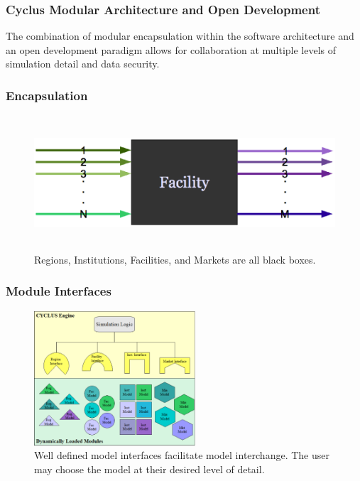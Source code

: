 \begin{frame}
  \frametitle{Cyclus Modular Architecture and Open Development}
  The combination of modular encapsulation within the software
  architecture and an open development paradigm allows for collaboration
  at multiple levels of simulation detail and data security.
\end{frame}
\begin{frame}[ctb!]
  \frametitle{Encapsulation}
  \begin{figure}[htbp!]
    \begin{center}
      \includegraphics[height=5cm]{facility.eps}
    \end{center}
    \caption{ Regions, Institutions, Facilities, and Markets are all
    black boxes.} 
    \label{fig:sinkfacility}
  \end{figure}
\end{frame}
\begin{frame}[ctb!]
  \frametitle{Module Interfaces}
  \begin{figure}[htbp!]
    \begin{center}
      \includegraphics[height=5cm]{interfaces.eps}
    \caption{Well defined model interfaces facilitate model 
    interchange. The user may choose the model at their desired level  
    of detail.}
    \label{fig:interfaces}
    \end{center}
  \end{figure}
\end{frame}

